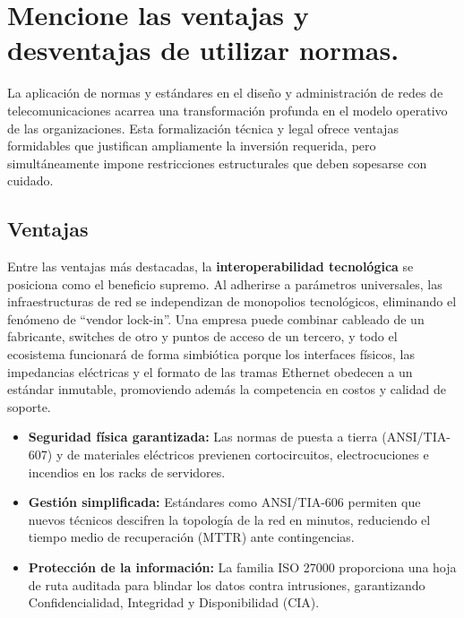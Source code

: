 \documentclass[a4paper,12pt]{article}
\begin{document}
\newpage

\section{Mencione las ventajas y desventajas de utilizar normas.}

La aplicación de normas y estándares en el diseño y administración de redes de telecomunicaciones acarrea una transformación profunda en el modelo operativo de las organizaciones. Esta formalización técnica y legal ofrece ventajas formidables que justifican ampliamente la inversión requerida, pero simultáneamente impone restricciones estructurales que deben sopesarse con cuidado.

\subsection*{Ventajas}

Entre las ventajas más destacadas, la \textbf{interoperabilidad tecnológica} se posiciona como el beneficio supremo. Al adherirse a parámetros universales, las infraestructuras de red se independizan de monopolios tecnológicos, eliminando el fenómeno de ``vendor lock-in''. Una empresa puede combinar cableado de un fabricante, switches de otro y puntos de acceso de un tercero, y todo el ecosistema funcionará de forma simbiótica porque los interfaces físicos, las impedancias eléctricas y el formato de las tramas Ethernet obedecen a un estándar inmutable, promoviendo además la competencia en costos y calidad de soporte.

\begin{itemize}
    \item \textbf{Seguridad física garantizada:} Las normas de puesta a tierra (ANSI/TIA-607) y de materiales eléctricos previenen cortocircuitos, electrocuciones e incendios en los racks de servidores.
    \item \textbf{Gestión simplificada:} Estándares como ANSI/TIA-606 permiten que nuevos técnicos descifren la topología de la red en minutos, reduciendo el tiempo medio de recuperación (MTTR) ante contingencias.
    \item \textbf{Protección de la información:} La familia ISO 27000 proporciona una hoja de ruta auditada para blindar los datos contra intrusiones, garantizando Confidencialidad, Integridad y Disponibilidad (CIA).
\end{itemize}
\end{document}
